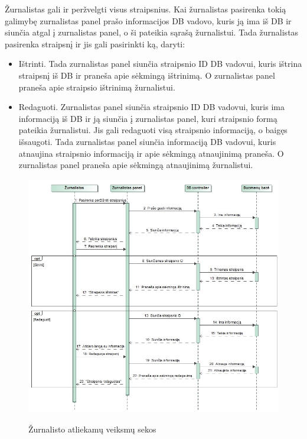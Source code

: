 ﻿\documentclass{VUMIFPSkursinis}
\begin{document}
Žurnalistas gali ir peržvelgti visus straipsnius. Kai žurnalistas pasirenka tokią galimybę zurnalistas panel prašo informacijos DB vadovo, kuris ją ima iš DB ir siunčia atgal į zurnalistas panel, o ši pateikia sąrašą žurnalistui. Tada žurnalistas pasirenka straipsnį ir jis gali pasirinkti ką, daryti:
\begin{itemize}
\item Ištrinti. Tada zurnalistas panel siunčia straipsnio ID DB vadovui, kuris ištrina straipsnį iš DB ir praneša apie sėkmingą ištrinimą. O zurnalistas panel praneša apie straipsio ištrinimą žurnalistui.
\item Redaguoti. Zurnalistas panel siunčia straipsnio ID DB vadovui, kuris ima informaciją iš DB ir ją siunčia į zurnalistas panel, kuri straipsnio formą pateikia žurnalistui. Jis gali redaguoti visą straipsnio informaciją, o baigęs išsaugoti. Tada zurnalistas panel siunčia informaciją DB vadovui, kuris atnaujina straipsnio informaciją ir apie sėkmingą atnaujinimą praneša. O zurnalistas panel praneša apie sėkmingą atnaujinimą žurnalistui.
\end{itemize}	
	
\begin{figure}[H]
    \centering
    \includegraphics[scale=0.45]{img/Pav/ZurnalistasIstrina_Redaguoja}
    \label{img:uml16}
	\caption{Žurnalisto atliekamų veiksmų sekos}
\end{figure}	
	
\end{document}
